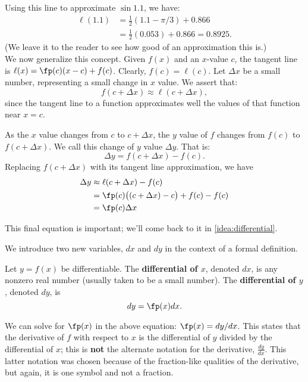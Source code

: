 Using this line to approximate $\sin 1.1$, we have:
\begin{align*}
	\ell(1.1) &= \frac12(1.1-\pi/3)+0.866 \\
					&= \frac12(0.053)+0.866 = 0.8925.
\end{align*}
(We leave it to the reader to see how good of an approximation this is.)\\

We now generalize this concept. Given $f(x)$ and an $x$-value $c$,  the tangent line is $\ell(x) = \fp(c)(x-c)+f(c)$. Clearly, $f(c) = \ell(c)$. Let $\Delta x$ be a small number, representing a small change in $x$ value. We assert that:
\[f(c+\Delta x) \approx \ell(c+\Delta x),\]
since the tangent line to a function approximates well the values of that function near $x=c$. 

As the $x$ value changes from $c$ to $c+\Delta x$, the $y$ value of $f$ changes from $f(c)$ to $f(c+\Delta x)$. We call this change of $y$ value $\Delta y$. That is:
\[\Delta y = f(c+\Delta x)-f(c).\]
Replacing $f(c+\Delta x)$ with its tangent line approximation, we have 
\begin{align}
	\Delta y &\approx \ell(c+\Delta x) - f(c) \notag\\
	&= \fp(c)\big((c+\Delta x)-c\big)+f(c) - f(c)\notag \\
	&=\fp(c)\Delta x		\label{eq:differential}
\end{align}

This final equation is important; we'll come back to it in \autoref{idea:differential}.

We introduce two new variables, $dx$ and $dy$ in the context of a formal definition. %

\begin{definition}\label{def:differential}
Let $y=f(x)$ be differentiable. The \textbf{differential of $x$}, denoted $dx$, is any nonzero real number (usually taken to be a small number). The \textbf{differential of $y$}, denoted $dy$, is
\[dy = \fp(x)dx.\]
\end{definition}

We can solve for $\fp(x)$ in the above equation: $\fp(x) = dy/dx$. This states that the derivative of $f$ with respect to $x$ is the differential of $y$ divided by the differential of $x$; this is \textbf{not} the alternate notation for the derivative, $\frac{dy}{dx}$. This latter notation was chosen because of the fraction-like qualities of the derivative, but again, it is one symbol and not a fraction.

